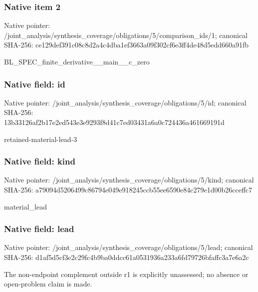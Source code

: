 \documentclass[10pt,a4paper]{article}
\begin{document}
\subsubsection{Native item 2}
Native pointer: /joint\_\allowbreak{}analysis/synthesis\_\allowbreak{}coverage/obligations/5/comparison\_\allowbreak{}ids/1; canonical SHA-256: ce129def391c08c8d2a4c4dba1ef3663a09f302cf6e3ff4de48d5edd660a91fb

\begingroup\raggedright\sloppy BL\_\allowbreak{}SPEC\_\allowbreak{}finite\_\allowbreak{}derivative\_\allowbreak{}\_\allowbreak{}main\_\allowbreak{}\_\allowbreak{}c\_\allowbreak{}zero\par\endgroup

\subsubsection{Native field: id}
Native pointer: /joint\_\allowbreak{}analysis/synthesis\_\allowbreak{}coverage/obligations/5/id; canonical SHA-256: 13b33126af2b17e2ed543e3e9293f8d41c7ed03431a6a0c724436a461669191d

\begingroup\raggedright\sloppy retained-material-lead-3\par\endgroup

\subsubsection{Native field: kind}
Native pointer: /joint\_\allowbreak{}analysis/synthesis\_\allowbreak{}coverage/obligations/5/kind; canonical SHA-256: a79094d5206499c86794e049e918245ccb55ee6590e84c279e1d00b26cceffc7

\begingroup\raggedright\sloppy material\_\allowbreak{}lead\par\endgroup

\subsubsection{Native field: lead}
Native pointer: /joint\_\allowbreak{}analysis/synthesis\_\allowbreak{}coverage/obligations/5/lead; canonical SHA-256: d1af5d5cf3e2c29fc4b9ba0ddcc61a0531936a233a6fd79726bfaffc3a7e6a2c

\begingroup\raggedright\sloppy The non-endpoint complement outside r1 is explicitly unassessed;\allowbreak{} no absence or open-problem claim is made.\par\endgroup
\end{document}
